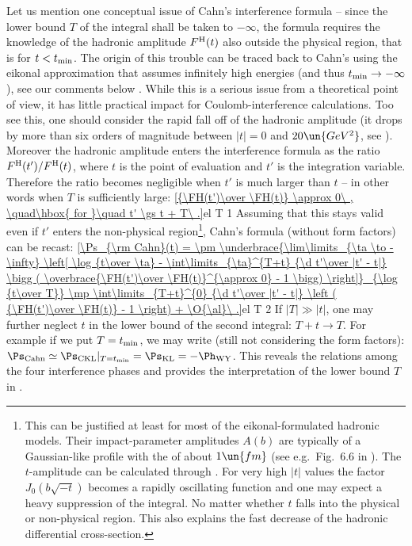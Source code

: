 Let us mention one conceptual issue of Cahn's interference formula  -- since the lower bound $T$ of the integral shall be taken to $-\infty$, the formula requires the knowledge of the hadronic amplitude $F^{\rm H}(t)$ also outside the physical region, that is for $t < t_{\rm min}$. The origin of this trouble can be traced back to Cahn's using the eikonal approximation that assumes infinitely high energies (and thus $t_{\rm min} \to -\infty$), see our comments below . While this is a serious issue from a theoretical point of view,  it has little practical impact for Coulomb-interference calculations. Too see this, one should consider the rapid fall off of the hadronic amplitude (it drops by more than six orders of magnitude between $|t|=0$ and $20\un{GeV^2}$, see ). Moreover the hadronic amplitude enters the interference formula  as the ratio $F^{\rm H}(t') / F^{\rm H}(t)$, where $t$ is the point of evaluation and $t'$ is the integration variable. Therefore the ratio becomes negligible when $t'$ is much larger than $t$ -- in other words when $T$ is sufficiently large:
\eqref{{\FH(t')\over \FH(t)} \approx 0\ , \quad\hbox{ for }\quad t' \gs t + T\ .}{el T 1}
Assuming that this stays valid even if $t'$ enters the non-physical region\footnote{%
This can be justified at least for most of the eikonal-formulated hadronic models. Their impact-parameter amplitudes $A(b)$ are typically of a Gaussian-like profile with the  of about $1\un{fm}$ (see e.g.~Fig.~6.6 in ). The $t$-amplitude can be calculated through . For very high $|t|$ values the factor $J_0(b\sqrt{-t})$ becomes a rapidly oscillating function and one may expect a heavy suppression of the integral. No matter whether $t$ falls into the physical or non-physical region. This also explains the fast decrease of the hadronic differential cross-section. 
}, Cahn's formula  (without form factors) can be recast:
\eqref{\Ps_{\rm Cahn}(t) =
\pm \underbrace{\lim\limits_{\ta \to -\infty} \left[
	\log {t\over \ta}
	- \int\limits_{\ta}^{T+t} {\d t'\over |t' - t|} \bigg ( \overbrace{\FH(t')\over \FH(t)}^{\approx 0} - 1 \bigg)
\right]}_{\log {t\over T}}
\mp \int\limits_{T+t}^{0} {\d t'\over |t' - t|} \left ( {\FH(t')\over \FH(t)} - 1 \right)
+ \O{\al}\ .}{el T 2}
If $|T| \gg |t|$, one may further neglect $t$ in the lower bound of the second integral: $T+t\rightarrow T$. For example if we put $T=t_{\rm min}$, we may write (still not considering the form factors): $\Ps_{\rm Cahn} \simeq \Ps_{\rm CKL}|_{T=t_{\rm min}} = \Ps_{\rm KL} = - \Ph_{\rm WY}$. This reveals the relations among the four interference phases and provides the interpretation of the lower bound $T$ in .

